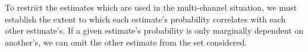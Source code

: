 \documentclass[10pt]{article}
\begin{document}
To restrict the estimates which are used in the multi-channel situation, we must establish the extent to which each estimate's probability correlates with each other estimate's.  If a given estimate's probability is only marginally dependent on another's, we can omit the other estimate from the set considered.
\end{document}
